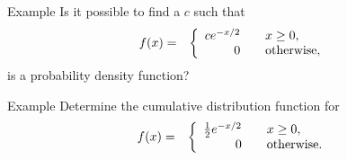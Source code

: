 \begin{frame}{Example}
  Is it possible to find a $c$ such that
  \begin{eqnarray*}
    f(x) & = & \left\{
    \begin{array}{r@{\hspace{2em}}l}
      c e^{-x/2} &  x \geq 0, \\
      0 & \mathrm{otherwise},
    \end{array}
    \right.
  \end{eqnarray*}
  is a probability density function?
\end{frame}

\begin{frame}{Example}
  Determine the cumulative distribution function for 
  \begin{eqnarray*}
    f(x) & = & \left\{
    \begin{array}{r@{\hspace{2em}}l}
      \half e^{-x/2} &  x \geq 0, \\
      0 & \mathrm{otherwise}.
    \end{array}
    \right.
  \end{eqnarray*}
\end{frame}



